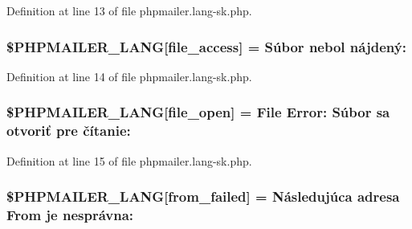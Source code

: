 Definition at line 13 of file phpmailer.\+lang-\/sk.\+php.

\subsubsection[{\texorpdfstring{\$\+P\+H\+P\+M\+A\+I\+L\+E\+R\+\_\+\+L\+A\+NG}{$PHPMAILER_LANG}}]{\setlength{\rightskip}{0pt plus 5cm}\$P\+H\+P\+M\+A\+I\+L\+E\+R\+\_\+\+L\+A\+NG\mbox{[}\textquotesingle{}file\+\_\+access\textquotesingle{}\mbox{]} = \textquotesingle{}Súbor nebol nájdený\+: \textquotesingle{}}\hypertarget{phpmailer_8lang-sk_8php_a7e83349023b856ef9e5c46e30ae6d51e}{}\label{phpmailer_8lang-sk_8php_a7e83349023b856ef9e5c46e30ae6d51e}


Definition at line 14 of file phpmailer.\+lang-\/sk.\+php.

\subsubsection[{\texorpdfstring{\$\+P\+H\+P\+M\+A\+I\+L\+E\+R\+\_\+\+L\+A\+NG}{$PHPMAILER_LANG}}]{\setlength{\rightskip}{0pt plus 5cm}\$P\+H\+P\+M\+A\+I\+L\+E\+R\+\_\+\+L\+A\+NG\mbox{[}\textquotesingle{}file\+\_\+open\textquotesingle{}\mbox{]} = \textquotesingle{}File Error\+: Súbor sa otvoriť pre čítanie\+: \textquotesingle{}}\hypertarget{phpmailer_8lang-sk_8php_a28d1a6517bf4c942a0ddd506188ad2e0}{}\label{phpmailer_8lang-sk_8php_a28d1a6517bf4c942a0ddd506188ad2e0}


Definition at line 15 of file phpmailer.\+lang-\/sk.\+php.

\subsubsection[{\texorpdfstring{\$\+P\+H\+P\+M\+A\+I\+L\+E\+R\+\_\+\+L\+A\+NG}{$PHPMAILER_LANG}}]{\setlength{\rightskip}{0pt plus 5cm}\$P\+H\+P\+M\+A\+I\+L\+E\+R\+\_\+\+L\+A\+NG\mbox{[}\textquotesingle{}from\+\_\+failed\textquotesingle{}\mbox{]} = \textquotesingle{}Následujúca adresa From je nesprávna\+: \textquotesingle{}}\hypertarget{phpmailer_8lang-sk_8php_adf832ae12155a09be077c6d5e4fd7e22}{}\label{phpmailer_8lang-sk_8php_adf832ae12155a09be077c6d5e4fd7e22}


